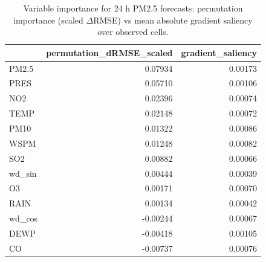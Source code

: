 \begin{table}
\caption{Variable importance for 24 h PM2.5 forecasts: permutation importance (scaled $\Delta$RMSE) vs mean absolute gradient saliency over observed cells.}
\label{tab:importance}
\begin{tabular}{lrr}
\toprule
 & permutation\_dRMSE\_scaled & gradient\_saliency \\
\midrule
PM2.5 & 0.07934 & 0.00173 \\
PRES & 0.05710 & 0.00106 \\
NO2 & 0.02396 & 0.00074 \\
TEMP & 0.02148 & 0.00072 \\
PM10 & 0.01322 & 0.00086 \\
WSPM & 0.01248 & 0.00082 \\
SO2 & 0.00882 & 0.00066 \\
wd\_sin & 0.00444 & 0.00039 \\
O3 & 0.00171 & 0.00070 \\
RAIN & 0.00134 & 0.00042 \\
wd\_cos & -0.00244 & 0.00067 \\
DEWP & -0.00418 & 0.00105 \\
CO & -0.00737 & 0.00076 \\
\bottomrule
\end{tabular}
\end{table}
